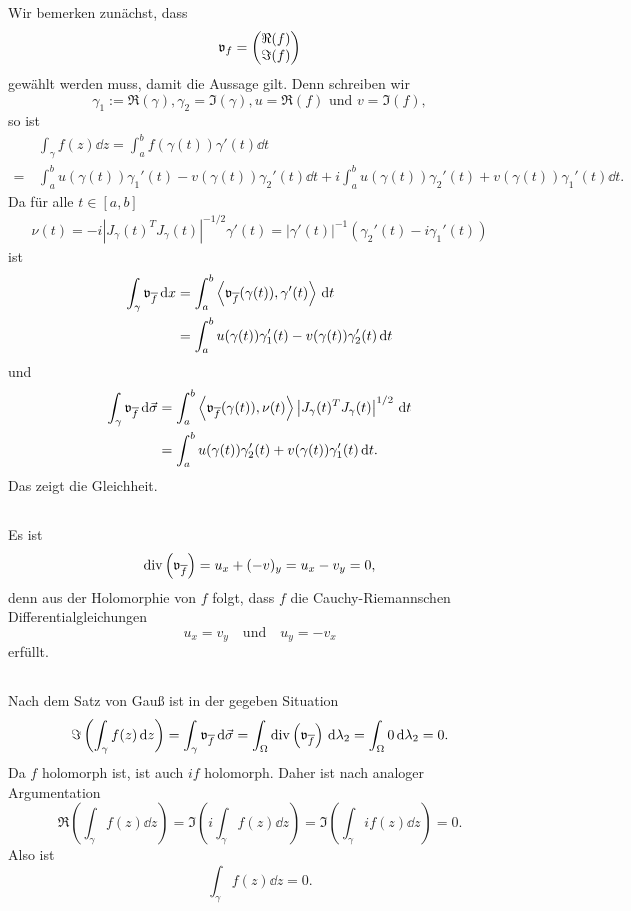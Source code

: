 \documentclass[a4paper,10pt]{article}
\begin{document}
\subsection{}
Wir bemerken zunächst, dass
\[
 \mathfrak{v}_f = \begin{pmatrix}\Re(f) \\ \Im(f)\end{pmatrix}
\]
gewählt werden muss, damit die Aussage gilt. Denn schreiben wir
\[
 \gamma_1 := \Re(\gamma), \gamma_2 = \Im(\gamma), u = \Re(f) \text{ und } v = \Im(f),
\]
so ist
\begin{align*}
 &\, \int_\gamma f(z) \dd{z}
 = \int_a^b f(\gamma(t)) \gamma'(t) \dd{t} \\
 =&\, \int_a^b u(\gamma(t))\gamma_1'(t) - v(\gamma(t))\gamma_2'(t) \dd{t}
   + i \int_a^b u(\gamma(t)) \gamma_2'(t) + v(\gamma(t)) \gamma_1'(t) \dd{t}.
\end{align*}
Da für alle $t \in [a,b]$
\begin{align*}
 \nu(t) = -i\left|J_\gamma(t)^T J_\gamma(t)\right|^{-1/2} \gamma'(t) = |\gamma'(t)|^{-1} \left(\gamma_2'(t) - i\gamma_1'(t)\right)
\end{align*}
ist
\begin{align*}
 \int_\gamma \mathfrak{v}_{\overline{f}} \,\text{d}x
 &= \int_a^b \left\langle \mathfrak{v}_{\overline{f}}(\gamma(t)), \gamma'(t) \right\rangle \,\text{d}t \\
 &= \int_a^b u(\gamma(t))\gamma_1'(t) - v(\gamma(t))\gamma_2'(t) \,\text{d}t
\end{align*}
und
\begin{align*}
 \int_\gamma \mathfrak{v}_{\overline{f}} \,\text{d}\vec{\sigma}
 &= \int_a^b \left\langle \mathfrak{v}_{\overline{f}}(\gamma(t)), \nu(t) \right\rangle \left|J_\gamma(t)^T J_\gamma(t)\right|^{1/2} \,\text{d}t \\
 &= \int_a^b u(\gamma(t))\gamma_2'(t) + v(\gamma(t))\gamma_1'(t) \,\text{d}t.
\end{align*}
Das zeigt die Gleichheit.


\subsection{}
Es ist
\[
 \operatorname{div}\left( \mathfrak{v}_{\overline{f}} \right)
 = u_x + (-v)_y
 = u_x - v_y
 = 0,
\]
denn aus der Holomorphie von $f$ folgt, dass $f$ die Cauchy-Riemannschen Differentialgleichungen
\[
 u_x = v_y \quad \text{und} \quad u_y = -v_x
\]
erfüllt.


\subsection{}
Nach dem Satz von Gauß ist in der gegeben Situation
\[
 \Im\left( \int_\gamma f(z) \,\text{d}z \right)
 = \int_\gamma \mathfrak{v}_{\overline{f}} \,\text{d}\vec{\sigma}
 = \int_\Omega \operatorname{div}\left(\mathfrak{v}_{\overline{f}}\right) \,\text{d}\lambda_2
 = \int_\Omega 0 \,\text{d}\lambda_2
 = 0.
\]
Da $f$ holomorph ist, ist auch $if$ holomorph. Daher ist nach analoger Argumentation
\[
 \Re\left( \int_\gamma f(z) \dd{z} \right)
 = \Im\left( i \int_\gamma f(z) \dd{z} \right)
 = \Im\left( \int_\gamma if(z) \dd{z} \right)
 = 0.
\]
Also ist
\[
 \int_\gamma f(z) \dd{z} = 0.
\]
\end{document}
